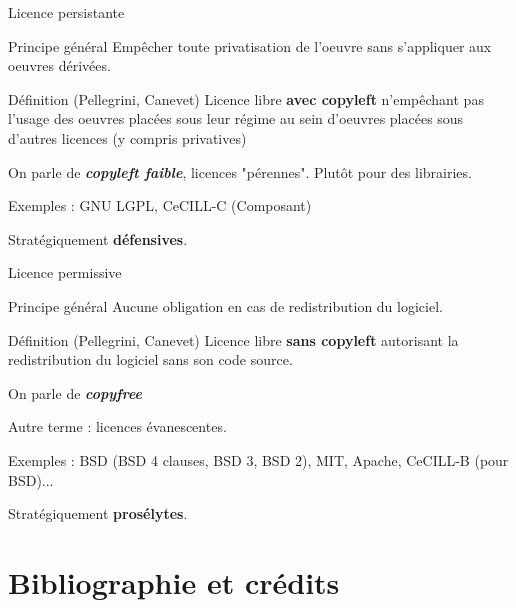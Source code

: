 \documentclass{beamer}
\begin{document}
\begin{frame}{Licence persistante}

\begin{block}{Principe général}
  Empêcher toute privatisation de l'oeuvre sans s'appliquer aux
  oeuvres dérivées.
\end{block}

  \begin{alertblock}{Définition (Pellegrini, Canevet)}
    Licence libre \textbf{avec copyleft} n'empêchant pas l'usage des
    oeuvres placées sous leur régime au sein d'oeuvres placées sous
    d'autres licences (y compris privatives)
  \end{alertblock}

  On parle de \textit{\textbf{copyleft faible}}, licences
  "pérennes". Plutôt pour des librairies.
 
  Exemples : GNU LGPL, CeCILL-C (Composant)

  Stratégiquement \textbf{défensives}.

\end{frame}


\begin{frame}{Licence permissive}
  \begin{block}{Principe général}
    Aucune obligation en cas de redistribution du logiciel.
  \end{block}

  \begin{alertblock}{Définition (Pellegrini, Canevet)}
    Licence libre \textbf{sans copyleft} autorisant la redistribution
    du logiciel sans son code source.
  \end{alertblock}

  On parle de \textit{\textbf{copyfree}}

  Autre terme : licences évanescentes.

  Exemples : BSD (BSD 4 clauses, BSD 3, BSD 2), MIT, Apache, CeCILL-B
  (pour BSD)...

  Stratégiquement \textbf{prosélytes}.
\end{frame}

\section{Bibliographie et crédits}
\end{document}
